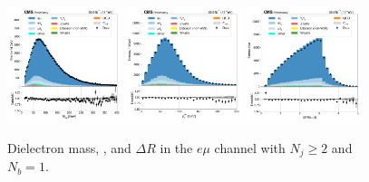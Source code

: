 \begin{figure}[htb!]
    \centering
    \includegraphics[width=0.3\textwidth]{chapters/Appendix/sectionPlots/figures/data_mc_overlays/emu_2016_cat_gt2_eq1_a_signal_linear_lepton_dilepton1_mass}
    \includegraphics[width=0.3\textwidth]{chapters/Appendix/sectionPlots/figures/data_mc_overlays/emu_2016_cat_gt2_eq1_a_signal_linear_lepton_dilepton1_pt}
    \includegraphics[width=0.3\textwidth]{chapters/Appendix/sectionPlots/figures/data_mc_overlays/emu_2016_cat_gt2_eq1_a_signal_linear_lepton_dilepton1_delta_r}
    \caption{Dielectron mass, \pt, and $\Delta R$ in the $e\mu$ channel
    with $N_{j} \geq 2$ and $N_{b} = 1$.}
    \label{fig:emu_5_dilepton}
\end{figure}

